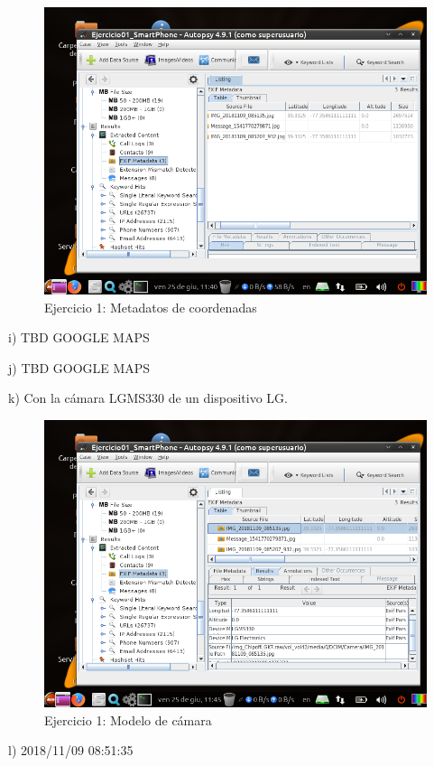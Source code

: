 \documentclass[11pt]{article}
\begin{document}
\begin{figure}[H]
    \caption{Ejercicio 1: Metadatos de coordenadas}
    \centering
    \includegraphics[scale=0.7]{e1-11.png}
\end{figure}

i) TBD GOOGLE MAPS

j) TBD GOOGLE MAPS

k) Con la cámara LGMS330 de un dispositivo LG.

\begin{figure}[H]
    \caption{Ejercicio 1: Modelo de cámara}
    \centering
    \includegraphics[scale=0.7]{e1-12.png}
\end{figure}

l) 2018/11/09 08:51:35
\end{document}
